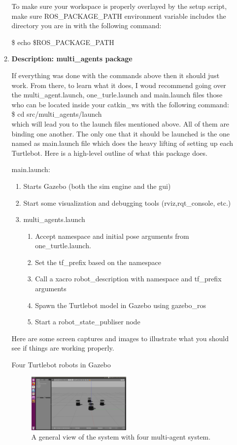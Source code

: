 \documentclass[journal]{IEEEtran}
\begin{document}
\begin{enumerate}
\begin{enumerate}
To make sure your workspace is properly overlayed by the setup script, make sure ROS{\_}PACKAGE{\_}PATH environment variable includes the directory you are in with the following command:

{\$} echo {\$}ROS{\_}PACKAGE{\_}PATH



\item \textbf {Description: multi{\_}agents package}


If everything was done with the commands above then it should just work. From there, to learn what it does, I woud recommend going over the multi{\_}agent.launch, one{\_}turle.launch and main.launch files those who can be located inside your catkin{\_}ws with the following command:\\
{\$} cd src/multi{\_}agents/launch \\
which will lead you to the launch files mentioned above. All of them are binding one another. The only one that it should be launched is the one named as main.launch file which does the heavy lifting of setting up each Turtlebot. Here is a high-level outline of what this package does.

main.launch:
\begin{enumerate}
\item {Starts Gazebo (both the sim engine and the gui)}
\item {Start some visualization and debugging tools (rviz,rqt{\_}console, etc.)}
\item {multi{\_}agents.launch}

\begin{enumerate}
\item {Accept namespace and initial pose arguments from one{\_}turtle.launch}.
\item {Set the tf{\_}prefix based on the namespace}
\item {Call a xacro robot{\_}description with namespace and tf{\_}prefix arguments}
\item {Spawn the Turtlebot model in Gazebo using gazebo{\_}ros}
\item {Start a robot{\_}state{\_}publiser node}
\end{enumerate}
\end{enumerate}
Here are some screen captures and images to illustrate what you should see if things are working properly.
    
 

Four Turtlebot robots in Gazebo
\begin{figure}[!h]
\begin{center}
\includegraphics[width=2in]{three.png}
\caption{A general view of the system with four multi-agent system.}
\end{center}
\label{fig:mypicture4}
\end{figure}



\end{enumerate}
\end{enumerate}
\end{document}
